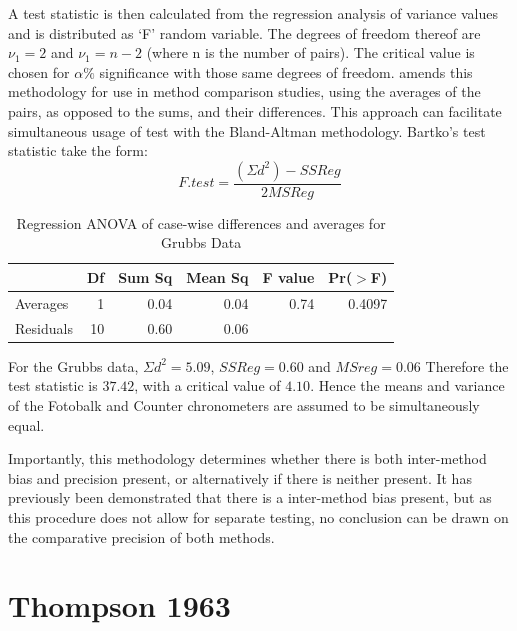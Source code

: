 \documentclass[12pt, a4paper]{report}
\theoremstyle{plain}
\theoremstyle{definition}
\theoremstyle{remark}
\begin{document}
		A test statistic is then calculated from the regression analysis
		of variance values \citep{BB89} and is distributed as `F' random
		variable. The degrees of freedom thereof are $\nu_{1}=2$ and
		$\nu_{1}=n-2$ (where n is the number of pairs). The critical value
		is chosen for $\alpha\%$ significance with those same degrees of
		freedom. \citet{Bartko} amends this methodology for use in method
		comparison studies, using the averages of the pairs, as opposed to
		the sums, and their differences. This approach can facilitate
		simultaneous usage of test with the Bland-Altman methodology.
		Bartko's test statistic take the form:
		\begin{equation} F.test = \frac{(\Sigma d^{2})-SSReg}{2MSReg}
		\end{equation}
		\begin{table}[ht]
			\begin{center}
				\begin{tabular}{lrrrrr}
					\hline
					& Df & Sum Sq & Mean Sq & F value & Pr($>$F) \\
					\hline
					Averages & 1 & 0.04 & 0.04 & 0.74 & 0.4097 \\
					Residuals & 10 & 0.60 & 0.06 &  &  \\
					\hline
				\end{tabular}
				\caption{Regression ANOVA of case-wise differences and averages
					for Grubbs Data}
			\end{center}
		\end{table}
		
		For the Grubbs data, $\Sigma d^{2}=5.09 $, $SSReg = 0.60$ and
		$MSreg=0.06$ Therefore the test statistic is $37.42$, with a
		critical value of $4.10$. Hence the means and variance of the
		Fotobalk and Counter chronometers are assumed to be simultaneously
		equal.
		
		Importantly, this methodology determines whether there is both
		inter-method bias and precision present, or alternatively if there
		is neither present. It has previously been demonstrated that there
		is a inter-method bias present, but as this procedure does not
		allow for separate testing, no conclusion can be drawn on the
		comparative precision of both methods.
		
		
		
		\section{Thompson 1963}
		
\end{document}

